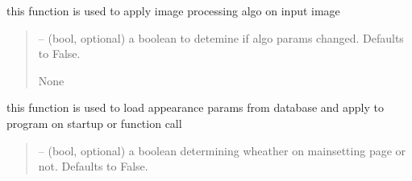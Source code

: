 \documentclass[letterpaper,10pt,english]{sphinxmanual}
\begin{document}
\begin{savenotes}
\begin{fulllineitems}

\begin{savenotes}\begin{fulllineitems}
\label{\detokenize{setting/setting_api:oxin.setting_api.API.image_processing_calibration}}
\pysigstartsignatures
{}
\pysigstopsignatures
\sphinxAtStartPar
this function is used to apply image processing algo on input image
\begin{quote}\begin{description}
\sphinxAtStartPar
{} – (bool, optional) a boolean to detemine if algo params changed. Defaults to False.

\sphinxAtStartPar
None

\end{description}\end{quote}

\end{fulllineitems}\end{savenotes}


\begin{savenotes}\begin{fulllineitems}
\label{\detokenize{setting/setting_api:oxin.setting_api.API.load_appearance_params_on_start}}
\pysigstartsignatures
{}
\pysigstopsignatures
\sphinxAtStartPar
this function is used to load appearance params from database and apply to program on start\sphinxhyphen{}up or function call
\begin{quote}\begin{description}
\sphinxAtStartPar
{} – (bool, optional) a boolean determining wheather on mainsetting page or not. Defaults to False.


\end{description}
\end{quote}
\end{fulllineitems}
\end{savenotes}
\end{fulllineitems}
\end{savenotes}
\end{document}

